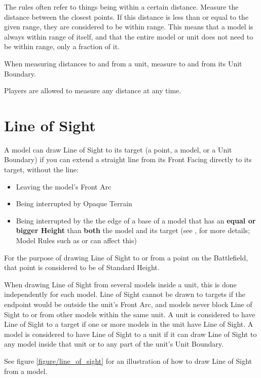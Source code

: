 The rules often refer to things being within a certain distance. Measure the distance between the closest points. If this distance is less than or equal to the given range, they are considered to be within range. This means that a model is always within range of itself, and that the entire model or unit does not need to be within range, only a fraction of it.

When measuring distances to and from a unit, measure to and from its Unit Boundary.

Players are allowed to measure any distance at any time.

\section{Line of Sight}
\label{line_of_sight}

A model can draw Line of Sight to its target (a point, a model, or a Unit Boundary) if you can extend a straight line from its Front Facing directly to its target, without the line:
\begin{itemize}
	\item Leaving the model's Front Arc
	\item Being interrupted by Opaque Terrain
	\item Being interrupted by the the edge of a base of a model that has an \textbf{equal or bigger Height} than \textbf{both} the model and its target (see , for more details; Model Rules such as \hyperref[tall]{\tall} or \hyperref[skirmisher]{\skirmisher} can affect this)
\end{itemize}


For the purpose of drawing Line of Sight to or from a point on the Battlefield, that point is considered to be of Standard Height.

When drawing Line of Sight from several models inside a unit, this is done independently for each model. Line of Sight cannot be drawn to targets if the endpoint would be outside the unit's Front Arc, and models never block Line of Sight to or from other models within the same unit. A unit is considered to have Line of Sight to a target if one or more models in the unit have Line of Sight. A model is considered to have Line of Sight to a unit if it can draw Line of Sight to any model inside that unit or to any part of the unit's Unit Boundary.

See figure \ref{figure/line_of_sight} for an illustration of how to draw Line of Sight from a model.

